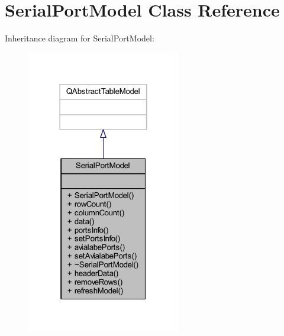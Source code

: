 \hypertarget{class_serial_port_model}{}\section{Serial\+Port\+Model Class Reference}
\label{class_serial_port_model}


Inheritance diagram for Serial\+Port\+Model\+:\nopagebreak
\begin{figure}[H]
\begin{center}
\leavevmode
\includegraphics[width=190pt]{d7/d95/class_serial_port_model__inherit__graph}
\end{center}
\end{figure}


